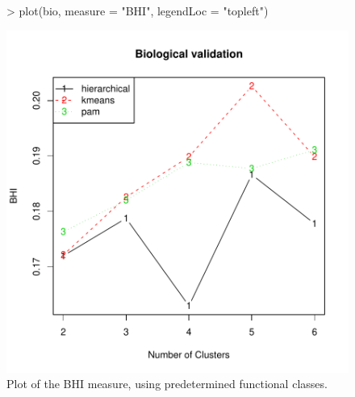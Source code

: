 \documentclass[11pt]{article}
\begin{document}
\begin{figure}
  \centering
\begin{Schunk}
\begin{Sinput}
> plot(bio, measure = "BHI", legendLoc = "topleft")
\end{Sinput}
\end{Schunk}
\includegraphics{clValid-015}
  \caption{Plot of the BHI measure, using predetermined functional classes.}
  \label{fig:BHI}
\end{figure}
\end{document}
